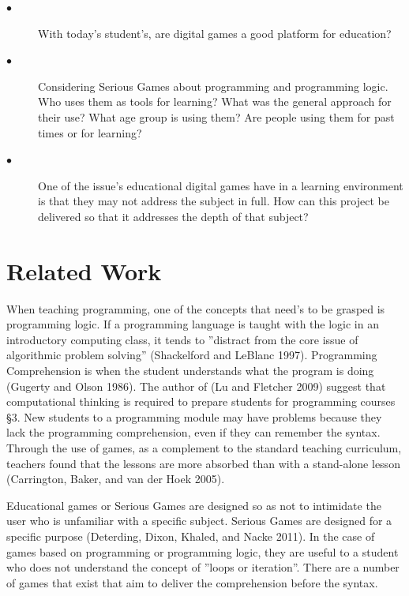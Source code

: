 \begin{description}
	\item[$\bullet$] With today’s student’s, are digital games a good platform for education?
	\item[$\bullet$] Considering Serious Games about programming and programming logic. Who uses them as tools for learning? What was the general approach for their use? What age group is using them? Are people using them for past times or for learning?
	\item[$\bullet$] One of the issue's educational digital games have in a learning environment is that they may not address the subject in full. How can this project be delivered so that it addresses the depth of that subject?
\end{description}


\section{Related Work}
When teaching programming, one of the concepts that need’s to be grasped is programming logic. If a programming language is taught with the logic in an introductory computing class, it tends to ”distract from the core issue of algorithmic problem solving” (Shackelford and LeBlanc 1997). Programming Comprehension is when the student understands what the program is doing (Gugerty and Olson 1986). The author of (Lu and Fletcher 2009) suggest that computational thinking is required to prepare students for programming courses §3. New students to a programming module may have problems because they lack the programming comprehension, even if they can remember the syntax. Through the use of games, as a complement to the standard teaching curriculum, teachers found that the lessons are more absorbed than with a stand-alone lesson (Carrington, Baker, and van der Hoek 2005).

Educational games or Serious Games are designed so as not to intimidate the user who is unfamiliar with a specific subject. Serious Games are designed for a specific purpose (Deterding, Dixon, Khaled, and Nacke 2011). In the case of games based on programming or programming logic, they are useful to a student who does not understand the concept of ”loops or iteration”. There are a number of games that exist that aim to deliver the comprehension before the syntax.

